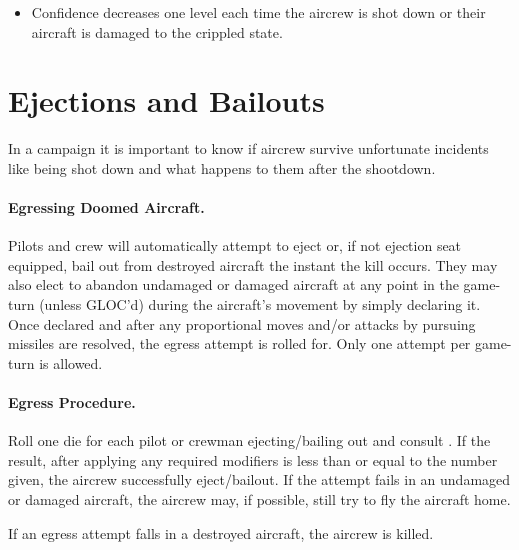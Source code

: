 \begin{advancedrules}
\begin{itemize}
    \item Confidence decreases one level each time the aircrew is shot down or their aircraft is damaged to the crippled state. 

\end{itemize}


\section{Ejections and Bailouts}
\label{rule:ejections-and-bail-outs}
\label{rule:emergency-egress}


In a campaign it is important to know if aircrew survive unfortunate incidents like being shot down and what happens to them after the shootdown.

\paragraph{Egressing Doomed Aircraft.} Pilots and crew will automatically attempt to eject or, if not ejection seat equipped, bail out from destroyed aircraft the instant the kill occurs. They may also elect to abandon undamaged or damaged aircraft at any point in the game-turn (unless GLOC'd) during the aircraft's movement by simply declaring it. Once declared and after any proportional moves and/or attacks by pursuing missiles are resolved, the egress attempt is rolled for. Only one attempt per game-turn is allowed.

\paragraph{Egress Procedure.} Roll one die for each pilot or crewman ejecting/bailing out and consult . If the result, after applying any required modifiers is less than or equal to the number given, the aircrew successfully eject/bailout.  If the attempt fails in an undamaged or damaged aircraft, the aircrew may, if possible, still try to fly the aircraft home.

If an egress attempt falls in a destroyed aircraft, the aircrew is killed.


\end{advancedrules}
